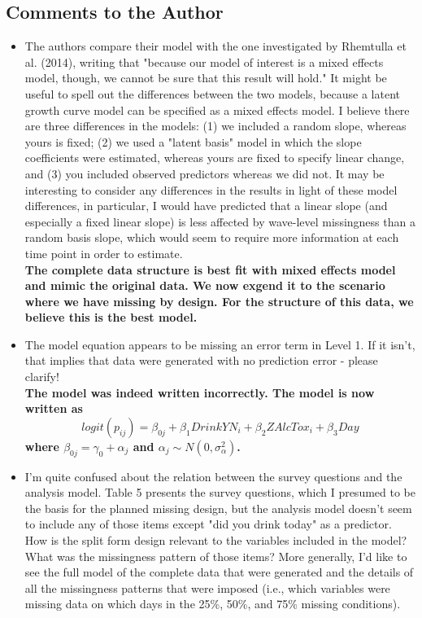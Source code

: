 \documentclass[letterpaper,12pt]{article}\usepackage[]{graphicx}\usepackage[]{color}
\begin{document}
\subsection{Comments to the Author}
\begin{itemize}

\item  The authors compare their model with the one investigated by Rhemtulla et al. (2014), writing that "because our model of interest is a mixed effects model, though, we cannot be sure that this result will hold." It might be useful to spell out the differences between the two models, because a latent growth curve model can be specified as a mixed effects model. I believe there are three differences in the models: (1) we included a random slope, whereas yours is fixed; (2) we used a "latent basis" model in which the slope coefficients were estimated, whereas yours are fixed to specify linear change, and (3) you included observed predictors whereas we did not. It may be interesting to consider any differences in the results in light of these model differences, in particular, I would have predicted that a linear slope (and especially a fixed linear slope) is less affected by wave-level missingness than a random basis slope, which would seem to require more information at each time point in order to estimate.\\

{\bf The complete data structure is best fit with mixed effects model and mimic the original data.  We now exgend it to the scenario where we have missing by design.  For the structure of this data, we believe this is the best model.}\\


\item The model equation appears to be missing an error term in Level 1. If it isn't, that implies that data were generated with no prediction error - please clarify!\\

{\bf The model was indeed written incorrectly.  The model is now written as $$
logit (p_{ij}) = \beta_{0j} + \beta_1DrinkYN_i + \beta_2ZAlcTox_i +\beta_3Day
$$
where $\beta_{0j} = \gamma_0 + \alpha_j$ and $\alpha_j \sim N(0,\sigma_\alpha^2)$.}\\

\item I'm quite confused about the relation between the survey questions and the analysis model. Table 5 presents the survey questions, which I presumed to be the basis for the planned missing design, but the analysis model doesn't seem to include any of those items except "did you drink today" as a predictor. How is the split form design relevant to the variables included in the model? What was the missingness pattern of those items? More generally, I'd like to see the full model of the complete data that were generated and the details of all the missingness patterns that were imposed (i.e., which variables were missing data on which days in the 25\%, 50\%, and 75\% missing conditions).\\


\end{itemize}
\end{document}
